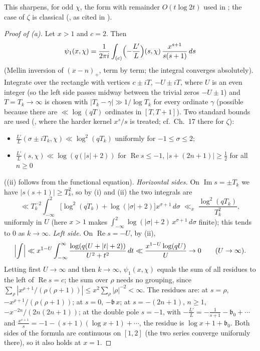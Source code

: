 \documentclass[11pt]{amsart}
\theoremstyle{definition}
\numberwithin{equation}{section}
\newcommand{\re}{\operatorname{Re}}
\newcommand{\im}{\operatorname{Im}}
\begin{document}
This sharpens, for odd $\chi$, the form with remainder $O(t\log2t)$
used in \cite[the lemma ``explicit formula for $\psi_1$'']{MC}; the case of $\zeta$ is classical
(\cite[Theorem~27]{Ing32}, as cited in \cite{Joh23}).

\begin{proof}[Proof of \textup{(a)}]
Let $x>1$ and $c=2$. Then
\[
\psi_1(x,\chi)=\frac1{2\pi i}\int_{(c)}\Bigl(-\frac{L'}{L}\Bigr)(s,\chi)\,
\frac{x^{s+1}}{s(s+1)}\,ds
\]
(Mellin inversion of $(x-n)_+$, term by term; the integral converges
absolutely). Integrate over the rectangle with vertices $c\pm iT$,
$-U\pm iT$, where $U$ is an even integer (so the left side passes
midway between the trivial zeros $-U\pm1$) and $T=T_k\to\infty$ is
chosen with $|T_k-\gamma|\gg1/\log T_k$ for every ordinate $\gamma$
(possible because there are $\ll\log(qT)$ ordinates in $[T,T+1]$).
Two standard bounds are used (\cite[Ch.~19]{Dav00}, where the harder
kernel $x^s/s$ is treated; cf.\ Ch.~17 there for $\zeta$):
\begin{itemize}
\item[(i)] $\frac{L'}{L}(\sigma\pm iT_k,\chi)\ll\log^2(qT_k)$
uniformly for $-1\le\sigma\le2$;
\item[(ii)] $\frac{L'}{L}(s,\chi)\ll\log(q(|s|+2))$ for $\re s\le-1$,
$|s+(2n+1)|\ge\tfrac12$ for all $n\ge0$
\end{itemize}
((ii) follows from the functional equation). \emph{Horizontal
sides.} On $\im s=\pm T_k$ we have $|s(s+1)|\ge T_k^2$, so by (i) and
(ii) the two integrals are
\[
\ll T_k^{-2}\int_{-\infty}^{2}\bigl[\log^2(qT_k)+\log(|\sigma|+2)\bigr]
x^{\sigma+1}\,d\sigma\;\ll_x\;\frac{\log^2(qT_k)}{T_k^2},
\]
uniformly in $U$ (here $x>1$ makes
$\int_{-\infty}^2\log(|\sigma|+2)\,x^{\sigma+1}\,d\sigma$ finite);
this tends to $0$ as $k\to\infty$. \emph{Left side.} On $\re s=-U$,
by (ii),
\[
\Bigl|\int\Bigr|\ll x^{1-U}\int_{-\infty}^{\infty}
\frac{\log(q(U+|t|+2))}{U^2+t^2}\,dt\ll\frac{x^{1-U}\log(qU)}{U}
\to0\qquad(U\to\infty).
\]
Letting first $U\to\infty$ and then $k\to\infty$, $\psi_1(x,\chi)$
equals the sum of all residues to the left of $\re s=c$; the sum over
$\rho$ needs no grouping, since
$\sum_\rho|x^{\rho+1}/(\rho(\rho+1))|\le x^2\sum_\rho|\rho|^{-2}
<\infty$. The residues are: at $s=\rho$,
$-x^{\rho+1}/(\rho(\rho+1))$; at $s=0$, $-\mathfrak b\,x$; at
$s=-(2n+1)$, $n\ge1$, $-x^{-2n}/(2n(2n+1))$; at the double pole
$s=-1$, with $-\frac{L'}{L}=-\frac1{s+1}-\mathfrak b_0+\cdots$ and
$\frac{x^{s+1}}{s}=-1-(s+1)(\log x+1)+\cdots$, the residue is
$\log x+1+\mathfrak b_0$. Both sides of the formula are continuous on
$[1,2]$ (the two series converge uniformly there), so it also holds
at $x=1$.
\end{proof}
\end{document}
